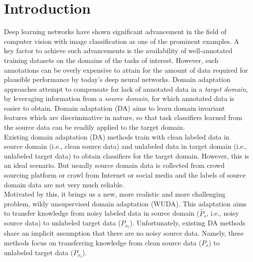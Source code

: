 \section{Introduction}
Deep learning networks have shown significant advancement in the field of computer vision with image classification\cite{imagenet} as one of the prominent examples. A key factor to achieve such advancements is the availability of well-annotated training datasets on the domains of the tasks of interest. However, such annotations can be overly expensive to attain for the amount of data required for plausible performance by today’s deep neural networks. Domain adaptation approaches attempt to compensate for lack of annotated data in a \textit{target domain}, by leveraging information from a \textit{source domain}, for which annotated data is easier to obtain. Domain adaptation (DA) aims to learn domain invariant features which are discriminative in nature,  so that task classifiers learned from the source data can be readily applied to the target domain\cite{uda,dann,ctc,ltdan,atda,saito2017maximum}.\\

Existing domain adaptation (DA) methods train with clean labeled data in source domain (i.e., clean source data) and unlabeled data in target domain (i.e., unlabeled target data) to obtain classifiers for the target domain. However, this is an ideal scenario. But usually source domain data is collected from crowd sourcing platform or crawl from Internet or social media and the labels of source domain data are not very much reliable.\\
Motivated by this, it brings us a new, more realistic and more challenging problem, wildy unsupervised domain adaptation (WUDA). This adaptation aims to transfer knowledge
from noisy labeled data in source domain ($\tilde{P_s}$, i.e., noisy source data) to unlabeled target data ($P_{x_{t}}$).
Unfortunately, existing DA methods share an implicit assumption that there are no noisy source data. Namely, these methods focus on transferring knowledge from clean source data ($P_s$) to unlabeled target data ($P_{x_{t}}$).\\

